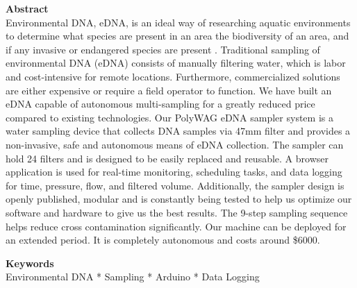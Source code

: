 \documentclass[11pt, letterpaper]{article}
\begin{document}
\begin{flushleft}
\textbf{Abstract} \\ 
Environmental DNA, eDNA, is an ideal way of researching aquatic environments to determine what species are present in an area the biodiversity of an area, and if any invasive or endangered species are present . Traditional sampling of environmental DNA (eDNA) consists of manually filtering water,  which is labor and cost-intensive for remote locations. Furthermore, commercialized solutions  are either expensive or require a field operator to function.  We have built an eDNA capable of autonomous multi-sampling for a greatly reduced price compared to existing technologies. Our PolyWAG eDNA sampler system is a water sampling device that collects DNA samples via 47mm filter and provides a non-invasive, safe and autonomous means of eDNA collection. The sampler can hold 24 filters and is designed to be easily replaced and reusable. A browser application is used for real-time monitoring, scheduling tasks, and data logging for time, pressure, flow, and filtered volume. Additionally, the sampler design is openly published, modular and is constantly being tested to help us optimize our software and hardware to give us the best results. The 9-step  sampling sequence helps reduce cross contamination significantly. Our machine can be deployed for an extended period. It is completely autonomous and costs around \$6000.



\textbf{Keywords}\\
Environmental DNA * Sampling * Arduino * Data Logging \\



\end{flushleft}
\end{document}
